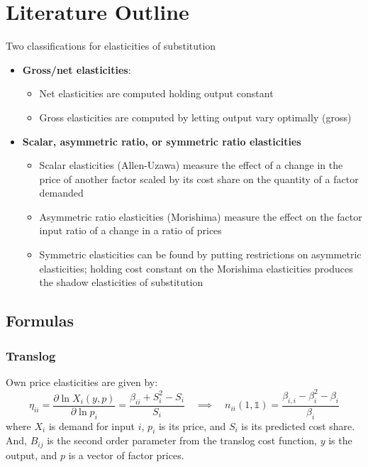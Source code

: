\documentclass[12pt,a4paper]{extarticle}
\begin{document}
	
%	
%	
%	
%	
	
	
\section{Literature Outline}

Two classifications for elasticities of substitution

\begin{itemize}
	\item \textbf{Gross/net elasticities}: 
	\begin{itemize}
		\item Net elasticities are computed holding output constant
		\item Gross elasticities are computed by letting output vary optimally (gross)
	\end{itemize}
	\item \textbf{Scalar, asymmetric ratio, or symmetric ratio elasticities}
	\begin{itemize}
		\item Scalar elasticities (Allen-Uzawa) measure the effect of a change in the price of another factor scaled by its cost share on the quantity of a factor demanded
		\item Asymmetric ratio elasticities (Morishima) measure the effect on the factor input ratio of a change in a ratio of prices
		\item Symmetric elasticities can be found by putting restrictions on asymmetric elasticities; holding cost constant on the Morishima elasticities produces the shadow elasticities of substitution
	\end{itemize} 
\end{itemize} 

\subsection{Formulas}

\subsubsection{Translog}

Own price elasticities are given by:
$$\eta_{ii} = \frac{\partial \ln X_i(y, p)}{\partial \ln p_i} = \frac{\beta_{ii} + S_i^2 - S_i}{S_i}
\quad \implies \quad n_{ii}(1, \mathbb{1}) = \frac{\beta_{i,i} - \beta_i^2 - \beta_i}{\beta_i}$$
where $X_i$ is demand for input $i$, $p_i$ is its price, and $S_i$ is its predicted cost share. And, $B_{ij}$ is the second order parameter from the translog cost function, $y$ is the output, and $p$ is a vector of factor prices. 
\end{document}
